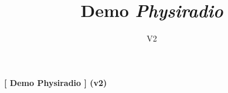 \documentclass[12pt]{article}
\title{Demo \textit{Physiradio}}
\author{}
\date{V2}
\begin{document}
\begin{center}
\textbf{[ Demo Physiradio ] (v2)}
\end{center}


\end{document}
